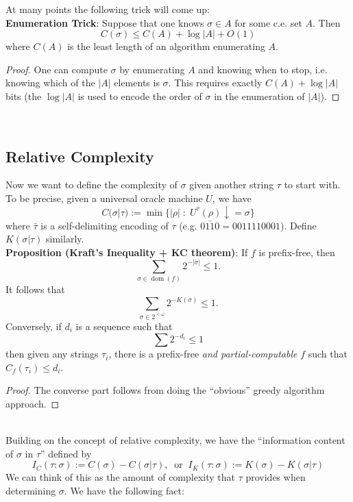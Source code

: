 \documentclass{amsart}
\DeclareMathOperator{\dom}{dom}
\begin{document}
	At many points the following trick will come up:\\
	
	\textbf{Enumeration Trick}: Suppose that one knows $\sigma \in A$ for some c.e. set $A$. Then 
	$$
	C(\sigma) \leq C(A) + \log|A| + O(1)
	$$ 
	where $C(A)$ is the least length of an algorithm enumerating $A$.
	\begin{proof}
		One can compute $\sigma$ by enumerating $A$ and knowing when to stop, i.e. knowing which of the $|A|$ elements is $\sigma$. This requires exactly $C(A) + \log|A|$ bits (the $\log|A|$ is used to encode the order of $\sigma$ in the enumeration of $|A|$).
	\end{proof}\\
	
	\subsection{Relative Complexity} Now we want to define the complexity of $\sigma$ given another string $\tau$ to start with. To be precise, given a universal oracle machine $U$, we have
	$$
	C(\sigma |\tau) := \min\{ |\rho| \; : \; U^{\bar{\tau}}(\rho) \downarrow = \sigma \}
	$$
	where $\bar{\tau}$ is a self-delimiting encoding of $\tau$ (e.g. $\bar{0110} = 0011110001$). Define $K(\sigma|\tau)$ similarly.\\
	
	\textbf{Proposition (Kraft's Inequality + KC theorem)}: If $f$ is prefix-free, then 
	$$
	\sum_{\sigma \in \dom(f)} 2^{-|\sigma|} \leq 1.
	$$
	It follows that 
	$$
	\sum_{\sigma \in 2^{<\omega}} 2^{-K(\sigma)} \leq 1.
	$$
	Conversely, if $d_i$ is a sequence such that 
	$$
	\sum 2^{-d_i} \leq 1
	$$
	then given any strings $\tau_i$, there is a prefix-free \textit{and partial-computable} $f$ such that $C_f(\tau_i) \leq d_i$.
	\begin{proof}
		The converse part follows from doing the ``obvious'' greedy algorithm approach.
	\end{proof}\\
	
	Building on the concept of relative complexity, we have the ``information content of $\sigma$ in $\tau$'' defined by
	$$
	I_C(\tau : \sigma) := C(\sigma) - C(\sigma | \tau), \;\; \text{or} \;\; I_K(\tau : \sigma) := K(\sigma) - K(\sigma | \tau)
	$$
	We can think of this as the amount of complexity that $\tau$ provides when determining $\sigma$. We have the following fact:\\
	
\end{document}
